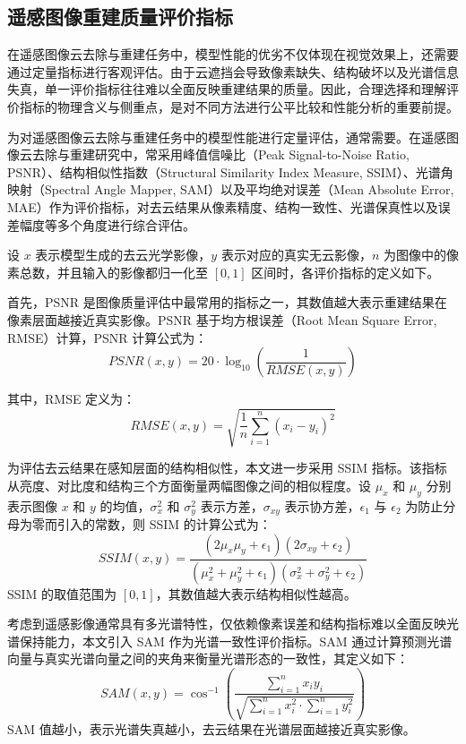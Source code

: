 \subsection{遥感图像重建质量评价指标}

在遥感图像云去除与重建任务中，模型性能的优劣不仅体现在视觉效果上，还需要通过定量指标进行客观评估。由于云遮挡会导致像素缺失、结构破坏以及光谱信息失真，单一评价指标往往难以全面反映重建结果的质量。因此，合理选择和理解评价指标的物理含义与侧重点，是对不同方法进行公平比较和性能分析的重要前提。

为对遥感图像云去除与重建任务中的模型性能进行定量评估，通常需要。在遥感图像云去除与重建研究中，常采用峰值信噪比（Peak Signal-to-Noise Ratio, PSNR）、结构相似性指数（Structural Similarity Index Measure, SSIM）、光谱角映射（Spectral Angle Mapper, SAM）以及平均绝对误差（Mean Absolute Error, MAE）作为评价指标，对去云结果从像素精度、结构一致性、光谱保真性以及误差幅度等多个角度进行综合评估。

设 $x$ 表示模型生成的去云光学影像，$y$ 表示对应的真实无云影像，$n$ 为图像中的像素总数，并且输入的影像都归一化至 $[0,1]$ 区间时，各评价指标的定义如下。

首先，PSNR 是图像质量评估中最常用的指标之一，其数值越大表示重建结果在像素层面越接近真实影像。PSNR 基于均方根误差（Root Mean Square Error, RMSE）计算，PSNR 计算公式为：
\begin{equation}
PSNR(x, y) = 20 \cdot \log_{10} \left( \frac{1}{RMSE(x, y)} \right)
\end{equation}

其中，RMSE 定义为：
\begin{equation}
RMSE(x, y) = \sqrt{\frac{1}{n} \sum_{i=1}^{n} (x_i - y_i)^2}
\end{equation}

为评估去云结果在感知层面的结构相似性，本文进一步采用 SSIM 指标。该指标从亮度、对比度和结构三个方面衡量两幅图像之间的相似程度。设 $\mu_x$ 和 $\mu_y$ 分别表示图像 $x$ 和 $y$ 的均值，$\sigma_x^2$ 和 $\sigma_y^2$ 表示方差，$\sigma_{xy}$ 表示协方差，$\epsilon_1$ 与 $\epsilon_2$ 为防止分母为零而引入的常数，则 SSIM 的计算公式为：
\begin{equation}
SSIM(x, y) = \frac{(2\mu_x \mu_y + \epsilon_1)(2\sigma_{xy} + \epsilon_2)}
{(\mu_x^2 + \mu_y^2 + \epsilon_1)(\sigma_x^2 + \sigma_y^2 + \epsilon_2)}
\end{equation}
SSIM 的取值范围为 $[0,1]$，其数值越大表示结构相似性越高。

考虑到遥感影像通常具有多光谱特性，仅依赖像素误差和结构指标难以全面反映光谱保持能力，本文引入 SAM 作为光谱一致性评价指标。SAM 通过计算预测光谱向量与真实光谱向量之间的夹角来衡量光谱形态的一致性，其定义如下：
\begin{equation}
SAM(x, y) = \cos^{-1} \left(
\frac{\sum_{i=1}^{n} x_i y_i}
{\sqrt{\sum_{i=1}^{n} x_i^2 \cdot \sum_{i=1}^{n} y_i^2}}
\right)
\end{equation}
SAM 值越小，表示光谱失真越小，去云结果在光谱层面越接近真实影像。

